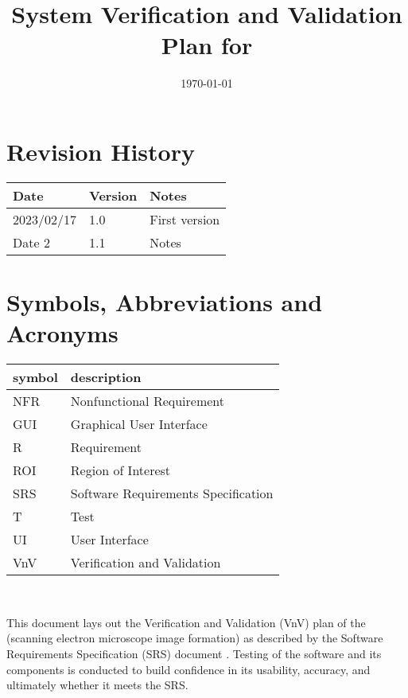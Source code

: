 \documentclass[12pt, titlepage]{article}
\begin{document}
\title{System Verification and Validation Plan for \progname{}} 
\author{\authname}
\date{\today}
	
\maketitle


\section{Revision History}

\begin{tabularx}{\textwidth}{p{3cm}p{2cm}X}
\toprule {\bf Date} & {\bf Version} & {\bf Notes}\\
\midrule
2023/02/17 & 1.0 & First version \\
Date 2 & 1.1 & Notes\\
\bottomrule
\end{tabularx}

\newpage

\tableofcontents

\listoftables

\newpage

\section{Symbols, Abbreviations and Acronyms}

\renewcommand{\arraystretch}{1.2}
\begin{tabular}{l l} 
  \toprule		
  \textbf{symbol} & \textbf{description}\\
  \midrule 
  NFR & Nonfunctional Requirement\\
  GUI & Graphical User Interface\\
  R & Requirement\\
  ROI & Region of Interest\\
  SRS & Software Requirements Specification\\
  T & Test\\
  UI & User Interface\\
  VnV & Verification and Validation\\
  \bottomrule
\end{tabular}\\

\newpage


This document lays out the Verification and Validation (VnV) plan of the \progname{} (scanning electron 
microscope image formation) as described by the Software Requirements Specification (SRS) 
document \citep{SRS}. Testing of the software and its components is conducted to build confidence in 
its usability, accuracy, and ultimately whether it meets the SRS.
\end{document}
